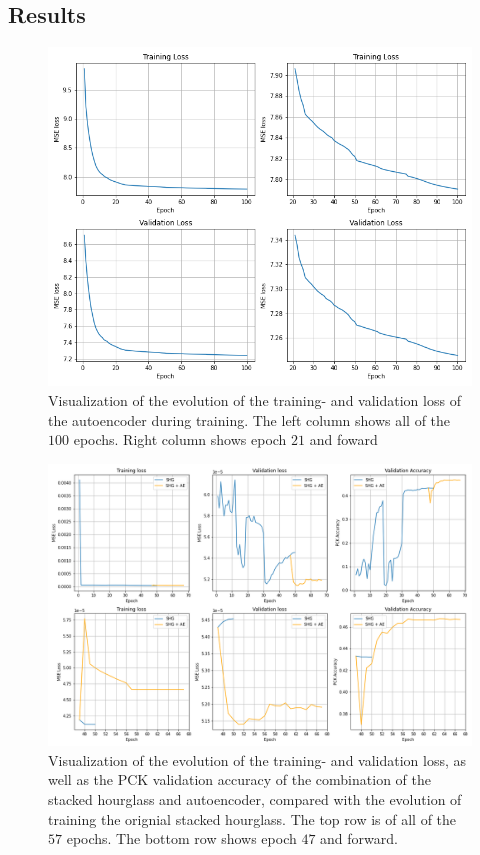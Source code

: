 \documentclass[./main.tex]{subfiles}
\begin{document}
\subsection{Results}\label{sec:improv_results}
\begin{figure}[htbp]
    \centering
    \includegraphics[height = 10 cm]{entities/AE_evolution.png}
    \caption{Visualization of the evolution of the training- and validation loss of the autoencoder during training. The left column shows all of the $100$ epochs. Right column shows epoch $21$ and foward}
    \label{fig:AE_evolution}
\end{figure}
\begin{figure}[htb]
    \centering
    \includegraphics[width = \textwidth]{entities//SHG_AE_Evolution.png}
    \caption{Visualization of the evolution of the training- and validation loss, as well as the PCK validation accuracy of the combination of the stacked hourglass and autoencoder, compared with the evolution of training the orignial stacked hourglass. The top row is of all of the $57$ epochs. The bottom row shows epoch $47$ and forward.}
    \label{fig:SHG_AE_evolution}
\end{figure}
\end{document}
